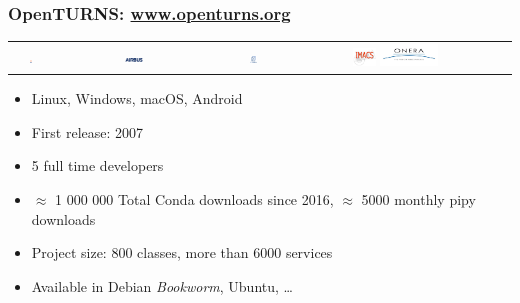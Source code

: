 \documentclass[aspectratio=169]{beamer}
\begin{document}
\begin{frame}
\frametitle{OpenTURNS: \url{www.openturns.org}}

\begin{center}
   \begin{tabular}{ccccc}
   \includegraphics[width=0.07\textwidth]{figures/logoEDF_Anne.png}&
   \includegraphics[width=0.12\textwidth]{figures/LogoAirbus.png}&
   \includegraphics[width=0.12\textwidth]{figures/logo_phimeca.png}&
   \includegraphics[width=0.12\textwidth]{figures/logo_Imacs.png}
   \includegraphics[width=0.30\textwidth]{figures/logo_ONERA.jpg}&
   \end{tabular}
\end{center}

\vspace*{0.05cm}
\begin{itemize}
\item Linux, Windows, macOS, Android
\item First release: 2007
\item 5 full time developers
\item $\approx $ 1 000 000 Total Conda downloads since 2016, $\approx $  5000 monthly pipy downloads
\item Project size: 800  classes, more than 6000 services
\item Available in Debian \emph{Bookworm}, Ubuntu, \ldots
\end{itemize}


\end{frame}

\end{document}
